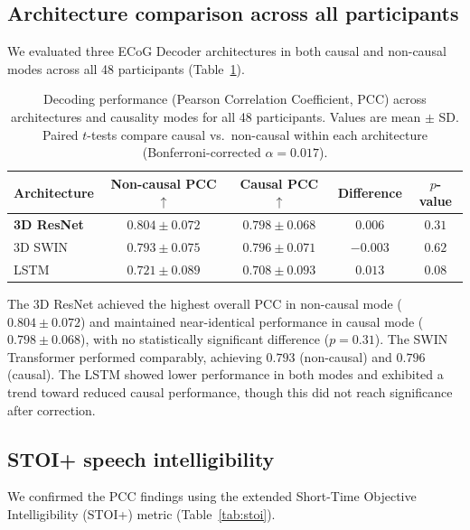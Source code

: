 \documentclass[11pt]{article}
\begin{document}
\subsection{Architecture comparison across all participants}

We evaluated three ECoG Decoder architectures in both causal and non-causal modes across all 48 participants (Table~\ref{tab:architecture}).

\begin{table}[H]
\centering
\caption{Decoding performance (Pearson Correlation Coefficient, PCC) across architectures and causality modes for all 48 participants. Values are mean $\pm$ SD. Paired $t$-tests compare causal vs.\ non-causal within each architecture (Bonferroni-corrected $\alpha = 0.017$).}
\label{tab:architecture}
\begin{tabular}{lcccc}
\toprule
\textbf{Architecture} & \textbf{Non-causal PCC} $\uparrow$ & \textbf{Causal PCC} $\uparrow$ & \textbf{Difference} & \textbf{$p$-value} \\
\midrule
\textbf{3D ResNet} & $\mathbf{0.804 \pm 0.072}$ & $\mathbf{0.798 \pm 0.068}$ & $0.006$ & $0.31$ \\
3D SWIN & $0.793 \pm 0.075$ & $0.796 \pm 0.071$ & $-0.003$ & $0.62$ \\
LSTM & $0.721 \pm 0.089$ & $0.708 \pm 0.093$ & $0.013$ & $0.08$ \\
\bottomrule
\end{tabular}
\end{table}

The 3D ResNet achieved the highest overall PCC in non-causal mode ($0.804 \pm 0.072$) and maintained near-identical performance in causal mode ($0.798 \pm 0.068$), with no statistically significant difference ($p = 0.31$). The SWIN Transformer performed comparably, achieving $0.793$ (non-causal) and $0.796$ (causal). The LSTM showed lower performance in both modes and exhibited a trend toward reduced causal performance, though this did not reach significance after correction.

\subsection{STOI+ speech intelligibility}

We confirmed the PCC findings using the extended Short-Time Objective Intelligibility (STOI+) metric \citep{taal2011} (Table~\ref{tab:stoi}).
\end{document}
